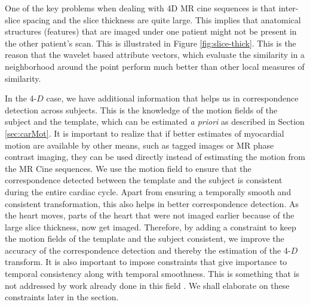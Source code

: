 One of the key problems when dealing with 4D MR cine sequences is that inter-slice spacing and the slice thickness are quite large. This implies that anatomical structures (features) that are imaged under one patient might not be present in the other patient's scan. This is illustrated in Figure \ref{fig:slice-thick}. This is the reason that the wavelet based attribute vectors, which evaluate the similarity in a neighborhood around the point perform much better than other local measures of similarity. 


In the 4-$D$ case, we have additional information that helps us in correspondence detection across subjects. This is the knowledge of the motion fields of the subject and the template, which can be estimated {\em a priori} as described in Section \ref{sec:carMot}. It is important to realize that if better estimates of myocardial motion are available by other means, such as tagged images or MR phase contrast imaging, they can be used directly instead of estimating the motion from the MR Cine sequences. We use the motion field to ensure that the correspondence detected between the template and the subject is consistent during the entire cardiac cycle. Apart from ensuring a temporally smooth and consistent transformation, this also helps in better correspondence detection. As the heart moves, parts of the heart that were not imaged earlier because of the large slice thickness, now get imaged. Therefore, by adding a constraint to keep the motion fields of the template and the subject consistent, we improve the accuracy of the correspondence detection and thereby the estimation of the 4-$D$ transform. It is also important to impose constraints that give importance to temporal consistency along with temporal smoothness. This is something that is not addressed by work already done in this field \cite{perperidis04}. We shall elaborate on these constraints later in the section.

